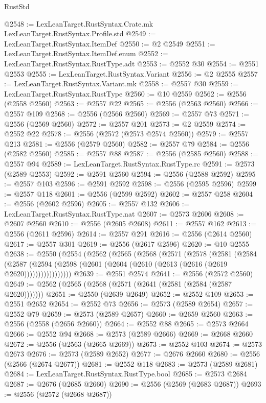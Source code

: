 \begin{lexlean}{RustStd}
\begin{coremodule}
@2548 := LexLeanTarget.RustSyntax.Crate.mk LexLeanTarget.RustSyntax.Profile.std
@2549 := LexLeanTarget.RustSyntax.ItemDef
@2550 := @2 @2549
@2551 := LexLeanTarget.RustSyntax.ItemDef.enum
@2552 := LexLeanTarget.RustSyntax.RustType.adt
@2553 := @2552 @30
@2554 := @2551 @2553
@2555 := LexLeanTarget.RustSyntax.Variant
@2556 := @2 @2555
@2557 := LexLeanTarget.RustSyntax.Variant.mk
@2558 := @2557 @30
@2559 := LexLeanTarget.RustSyntax.RustType
@2560 := @10 @2559
@2562 := @2556 (@2558 @2560)
@2563 := @2557 @22
@2565 := @2556 (@2563 @2560)
@2566 := @2557 @109
@2568 := @2556 (@2566 @2560)
@2569 := @2557 @73
@2571 := @2556 (@2569 @2560)
@2572 := @2557 @201
@2573 := @2 @2559
@2574 := @2552 @22
@2578 := @2556 (@2572 (@2573 @2574 @2560))
@2579 := @2557 @213
@2581 := @2556 (@2579 @2560)
@2582 := @2557 @79
@2584 := @2556 (@2582 @2560)
@2585 := @2557 @88
@2587 := @2556 (@2585 @2560)
@2588 := @2557 @94
@2589 := LexLeanTarget.RustSyntax.RustType.rc
@2591 := @2573 (@2589 @2553)
@2592 := @2591 @2560
@2594 := @2556 (@2588 @2592)
@2595 := @2557 @103
@2596 := @2591 @2592
@2598 := @2556 (@2595 @2596)
@2599 := @2557 @118
@2601 := @2556 (@2599 @2592)
@2602 := @2557 @258
@2604 := @2556 (@2602 @2596)
@2605 := @2557 @132
@2606 := LexLeanTarget.RustSyntax.RustType.nat
@2607 := @2573 @2606
@2608 := @2607 @2560
@2610 := @2556 (@2605 @2608)
@2611 := @2557 @162
@2613 := @2556 (@2611 @2596)
@2614 := @2557 @291
@2616 := @2556 (@2614 @2560)
@2617 := @2557 @301
@2619 := @2556 (@2617 @2596)
@2620 := @10 @2555
@2638 := @2550
    (@2554
      (@2562
        (@2565
          (@2568
            (@2571
              (@2578
                (@2581
                  (@2584
                    (@2587
                      (@2594 (@2598 (@2601 (@2604 (@2610 (@2613 (@2616 (@2619 @2620)))))))))))))))))
@2639 := @2551 @2574
@2641 := @2556 (@2572 @2560)
@2649 := @2562 (@2565 (@2568 (@2571 (@2641 (@2581 (@2584 (@2587 @2620)))))))
@2651 := @2550 (@2639 @2649)
@2652 := @2552 @109
@2653 := @2551 @2652
@2654 := @2552 @73
@2656 := @2573 (@2589 @2654)
@2657 := @2552 @79
@2659 := @2573 (@2589 @2657)
@2660 := @2659 @2560
@2663 := @2556 (@2558 (@2656 @2660))
@2664 := @2552 @88
@2665 := @2573 @2664
@2666 := @2552 @94
@2668 := @2573 (@2589 @2666)
@2669 := @2668 @2660
@2672 := @2556 (@2563 (@2665 @2669))
@2673 := @2552 @103
@2674 := @2573 @2673
@2676 := @2573 (@2589 @2652)
@2677 := @2676 @2660
@2680 := @2556 (@2566 (@2674 @2677))
@2681 := @2552 @118
@2683 := @2573 (@2589 @2681)
@2684 := LexLeanTarget.RustSyntax.RustType.bool
@2685 := @2573 @2684
@2687 := @2676 (@2685 @2660)
@2690 := @2556 (@2569 (@2683 @2687))
@2693 := @2556 (@2572 (@2668 @2687))

\end{coremodule}
\end{lexlean}
